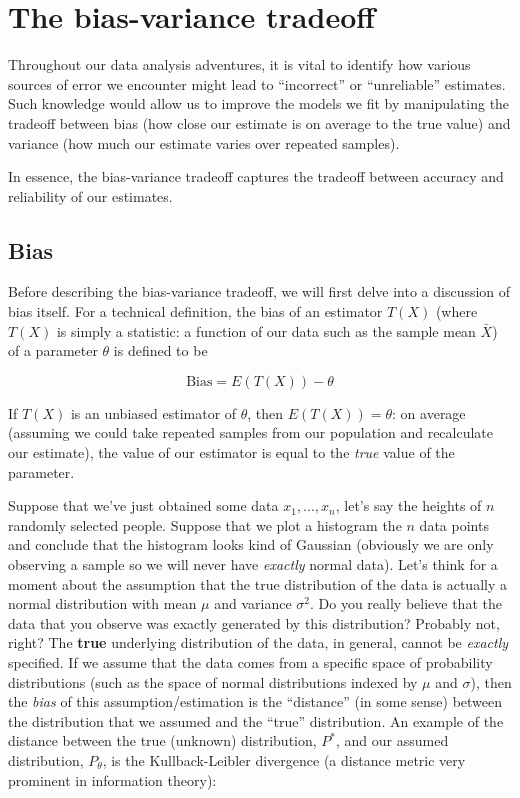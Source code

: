 

\chapter{The bias-variance tradeoff}
\label{ch:tradeoff}







Throughout our data analysis adventures, it is vital to identify how various sources of error we encounter might lead to ``incorrect'' or ``unreliable'' estimates. Such knowledge would allow us to improve the models we fit by manipulating the tradeoff between bias (how close our estimate is on average to the true value) and variance (how much our estimate varies over repeated samples).

In essence, the bias-variance tradeoff captures the tradeoff between accuracy and reliability of our estimates. 



\section{Bias}

Before describing the bias-variance tradeoff, we will first delve into a discussion of bias itself. For a technical definition, the bias of an estimator $T(X)$ (where $T(X)$ is simply a statistic: a function of our data such as the sample mean $\bar{X}$) of a parameter $\theta$ is defined to be 

$$\text{Bias} = E(T(X)) - \theta$$


If $T(X)$ is an unbiased estimator of $\theta$, then $E(T(X)) = \theta$: on average (assuming we could take repeated samples from our population and recalculate our estimate), the value of our estimator is equal to the \emph{true} value of the parameter.




Suppose that we've just obtained some data $x_1, ..., x_n$, let's say the heights of $n$ randomly selected people. Suppose that we plot a histogram the $n$ data points and conclude that the histogram looks kind of Gaussian (obviously we are only observing a sample so we will never have \emph{exactly} normal data). Let's think for a moment about the assumption that the true distribution of the data is actually a normal distribution with mean $\mu$ and variance $\sigma^2$. Do you really believe that the data that you observe was exactly generated by this distribution? Probably not, right? The \textbf{true} underlying distribution of the data, in general, cannot be \emph{exactly} specified. If we assume that the data comes from a specific space of probability distributions (such as the space of normal distributions indexed by $\mu$ and $\sigma$), then the \emph{bias} of this assumption/estimation is the ``distance'' (in some sense) between the distribution that we assumed and the ``true'' distribution. An example of the distance between the true (unknown) distribution, $P^*$, and our assumed distribution, $P_\theta$, is the Kullback-Leibler divergence (a distance metric very prominent in information theory):

